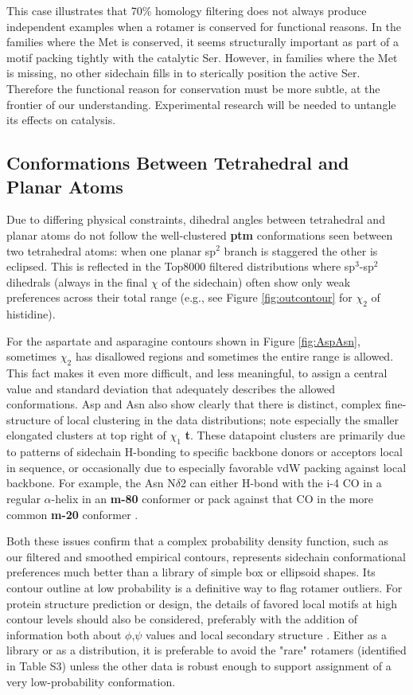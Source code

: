 This case illustrates that 70\% homology filtering does not always produce independent examples when a rotamer is conserved for functional reasons. In the families where the Met is conserved, it seems structurally important as part of a motif packing tightly with the catalytic Ser.  However, in families where the Met is missing, no other sidechain fills in to sterically position the active Ser.  Therefore the functional reason for conservation must be more subtle, at the frontier of our understanding.  Experimental research will be needed to untangle its effects on catalysis.

\subsection{Conformations Between Tetrahedral and Planar Atoms}
Due to differing physical constraints, dihedral angles between tetrahedral and planar atoms do not follow the well-clustered \textbf{ptm} conformations seen between two tetrahedral atoms: when one planar sp$^{2}$ branch is staggered the other is eclipsed. This is reflected in the Top8000 filtered distributions where sp$^{3}$-sp$^{2}$ dihedrals  (always in the final $\chi$ of the sidechain) often show only weak preferences across their total range (e.g., see Figure \ref{fig:outcontour} for $\chi_{2}$ of histidine).

For the aspartate and asparagine contours shown in Figure \ref{fig:AspAsn}, sometimes $\chi_{2}$ has disallowed regions and sometimes the entire range is allowed. This fact makes it even more difficult, and less meaningful, to assign a central value and standard deviation that adequately describes the allowed conformations. Asp and Asn also show clearly that there is distinct, complex fine-structure of local clustering in the data distributions; \textcolor{changecolor}{note especially the smaller elongated clusters at top right of $\chi_{1}$ \textbf{t}}. These datapoint clusters are primarily due to patterns of sidechain H-bonding to specific backbone donors or acceptors local in sequence, or occasionally due to especially favorable vdW packing against local backbone.  For example, the Asn N$\delta$2 can either H-bond with the i-4 CO in a regular $\alpha$-helix in an \textbf{m-80} conformer or pack against that CO in the more common \textbf{m-20} conformer \cite{Lovell1999}.

Both these issues confirm that a complex probability density function, such as our filtered and smoothed empirical contours, represents sidechain conformational preferences much better than a library of simple box or ellipsoid shapes. Its contour outline at low probability is a definitive way to flag rotamer outliers.  For protein structure prediction or design, the details of favored local motifs at high contour levels should also be considered, preferably with the addition of information both about $\phi$,$\psi$ values \cite{Bower1997} and local secondary structure \cite{lovell2000penultimate}. \textcolor{changecolor}{Either as a library or as a distribution, it is preferable to avoid the "rare" rotamers (identified in Table S3) unless the other data is robust enough to support assignment of a very low-probability conformation.}
